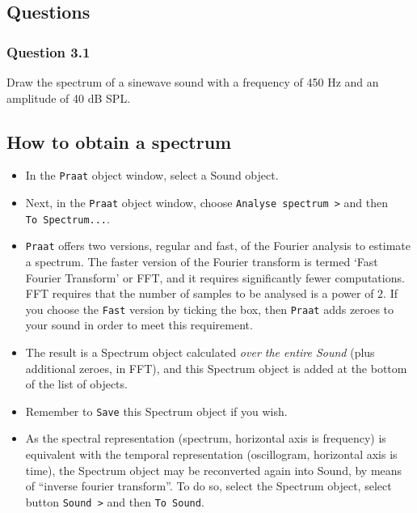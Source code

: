 \documentclass[
]{book}
\begin{document}
\protect{}\label{questions-spectrum}
\subsection*{Questions}\label{questions-2}

\subsubsection*{Question 3.1}\label{question-3.1}

Draw the spectrum of a sinewave sound with a frequency of 450 Hz and an amplitude of 40 dB SPL.

\protect{}\label{box:praatspectrum}
\subsection{How to obtain a spectrum}\label{how-to-obtain-a-spectrum}

\begin{itemize}
\item
  In the \texttt{Praat} object window, select a Sound object.
\item
  Next, in the \texttt{Praat} object window, choose \texttt{Analyse\ spectrum\ \textgreater{}} and then \texttt{To\ Spectrum...}.
\item
  \texttt{Praat} offers two versions, regular and fast, of the Fourier analysis to estimate a spectrum. The faster version of the Fourier transform is termed `Fast Fourier Transform' or FFT, and it requires significantly fewer computations. FFT requires that the number of samples to be analysed is a power of \(2\). If you choose the \texttt{Fast} version by ticking the box, then \texttt{Praat} adds zeroes to your sound in order to meet this requirement.
\item
  The result is a Spectrum object calculated \emph{over the entire Sound} (plus additional zeroes, in FFT), and this Spectrum object is added at the bottom of the list of objects.
\item
  Remember to \texttt{Save} this Spectrum object if you wish.
\item
  As the spectral representation (spectrum, horizontal axis is frequency) is equivalent with the temporal representation (oscillogram, horizontal axis is time), the Spectrum object may be reconverted again into Sound, by means of ``inverse fourier transform''.
  To do so, select the Spectrum object, select button \texttt{Sound\ \textgreater{}} and then \texttt{To\ Sound}.
\end{itemize}
\end{document}
